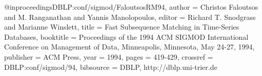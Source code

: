 @inproceedings{DBLP:conf/sigmod/FaloutsosRM94,
  author    = {Christos Faloutsos and
               M. Ranganathan and
               Yannis Manolopoulos},
  editor    = {Richard T. Snodgrass and
               Marianne Winslett},
  title     = {Fast Subsequence Matching in Time-Series Databases},
  booktitle = {Proceedings of the 1994 ACM SIGMOD International Conference on
               Management of Data, Minneapolis, Minnesota, May 24-27, 1994},
  publisher = {ACM Press},
  year      = {1994},
  pages     = {419-429},
  crossref  = {DBLP:conf/sigmod/94},
  bibsource = {DBLP, http://dblp.uni-trier.de}
}
